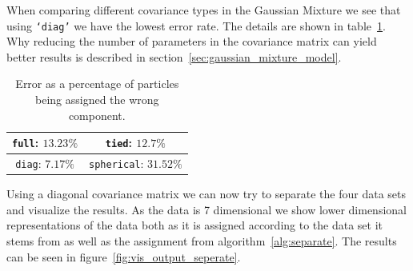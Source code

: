 When comparing different covariance types in the Gaussian Mixture we see that using \texttt{‘diag’} we have the lowest error rate. The details are shown in table~\ref{tab:covariance_type_comparison}. Why reducing the number of parameters in the covariance matrix can yield better results is described in section~\ref{sec:gaussian_mixture_model}.

\begin{table}[h!]
	\centering
	\begin{tabular}{|c|c|}
		\hline
		\texttt{full}: $13.23\%$ & \texttt{tied}: $12.7\%$ \\
		\hline
		\texttt{diag}: $7.17\%$ & \texttt{spherical}: $31.52\%$ \\
		\hline
	\end{tabular}
	\label{tab:covariance_type_comparison}
	\caption{Error as a percentage of particles being assigned the wrong component.}
\end{table}

Using a diagonal covariance matrix we can now try to separate the four data sets and visualize the results. As the data is 7 dimensional we show lower dimensional representations of the data both as it is assigned according to the data set it stems from as well as the assignment from algorithm~\ref{alg:separate}. The results can be seen in figure~\ref{fig:vis_output_seperate}.

